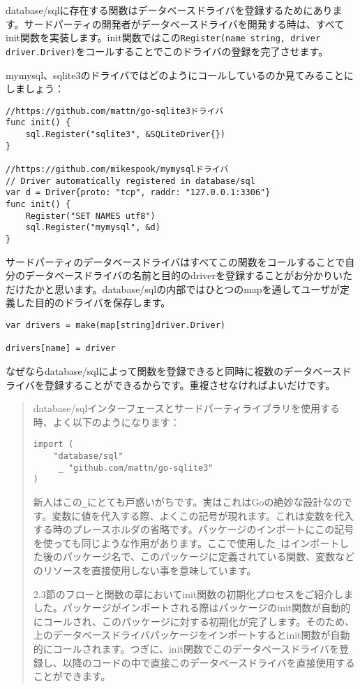 database/sqlに存在する関数はデータベースドライバを登録するためにあります。サードパーティの開発者がデータベースドライバを開発する時は、すべてinit関数を実装します。init関数ではこの\texttt{Register(name string, driver driver.Driver)}をコールすることでこのドライバの登録を完了させます。

mymysql、sqlite3のドライバではどのようにコールしているのか見てみることにしましょう：

\begin{lstlisting}[numbers=none]
//https://github.com/mattn/go-sqlite3ドライバ
func init() {
    sql.Register("sqlite3", &SQLiteDriver{})
}

//https://github.com/mikespook/mymysqlドライバ
// Driver automatically registered in database/sql
var d = Driver{proto: "tcp", raddr: "127.0.0.1:3306"}
func init() {
    Register("SET NAMES utf8")
    sql.Register("mymysql", &d)
}
\end{lstlisting}

サードパーティのデータベースドライバはすべてこの関数をコールすることで自分のデータベースドライバの名前と目的のdriverを登録することがお分かりいただけたかと思います。database/sqlの内部ではひとつのmapを通してユーザが定義した目的のドライバを保存します。

\begin{lstlisting}[numbers=none]
var drivers = make(map[string]driver.Driver)

drivers[name] = driver
\end{lstlisting}

なぜならdatabase/sqlによって関数を登録できると同時に複数のデータベースドライバを登録することができるからです。重複させなければよいだけです。


\begin{quote}
database/sqlインターフェースとサードパーティライブラリを使用する時、よく以下のようになります：
\begin{lstlisting}[numbers=none]
import (
    "database/sql"
     _ "github.com/mattn/go-sqlite3"
)
\end{lstlisting}
新人はこの\texttt{\_}にとても戸惑いがちです。実はこれはGoの絶妙な設計なのです。変数に値を代入する際、よくこの記号が現れます。これは変数を代入する時のプレースホルダの省略です。パッケージのインポートにこの記号を使っても同じような作用があります。ここで使用した\texttt{\_}はインポートした後のパッケージ名で、このパッケージに定義されている関数、変数などのリソースを直接使用しない事を意味しています。

2.3節のフローと関数の章においてinit関数の初期化プロセスをご紹介しました。パッケージがインポートされる際はパッケージのinit関数が自動的にコールされ、このパッケージに対する初期化が完了します。そのため、上のデータベースドライバパッケージをインポートするとinit関数が自動的にコールされます。つぎに、init関数でこのデータベースドライバを登録し、以降のコードの中で直接このデータベースドライバを直接使用することができます。
\end{quote}
